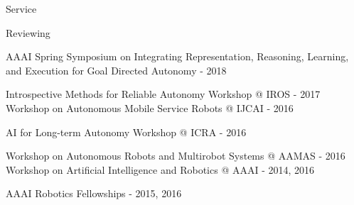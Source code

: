 \begin{rSection}{Service}
\begin{rSubsection}{Reviewing}{}{}{}
\item  AAAI Spring Symposium on Integrating Representation, Reasoning, Learning, and Execution for Goal Directed Autonomy - 2018
\item  Introspective Methods for Reliable Autonomy Workshop @ IROS - 2017 Workshop on Autonomous Mobile Service Robots @ IJCAI - 2016
\item  AI for Long-term Autonomy Workshop @ ICRA - 2016
\item  Workshop on Autonomous Robots and Multirobot Systems @ AAMAS - 2016 Workshop on Artificial Intelligence and Robotics @ AAAI - 2014, 2016
\item  AAAI Robotics Fellowships - 2015, 2016
\end{rSubsection}





\end{rSection}

